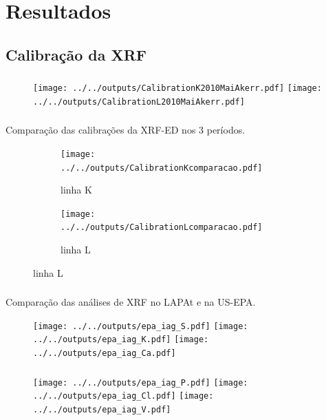 \section{Resultados}

\subsection{Calibração da XRF}

\begin{frame}
  \frametitle{}
  \begin{figure}
      \centering
      \texttt{[image: ../../outputs/CalibrationK2010MaiAkerr.pdf]}
      \texttt{[image: ../../outputs/CalibrationL2010MaiAkerr.pdf]}
  \end{figure}
\end{frame}

\begin{frame}
  \frametitle{}
  Comparação das calibrações da XRF-ED nos 3 períodos.
  \begin{figure}[H]
    \begin{subfigure}[b]{0.5\textwidth}
      \texttt{[image: ../../outputs/CalibrationKcomparacao.pdf]}
      \caption{linha K}
    \end{subfigure}%
    \begin{subfigure}[b]{0.5\textwidth}
      \texttt{[image: ../../outputs/CalibrationLcomparacao.pdf]}
      \caption{linha L}
    \end{subfigure}
  \end{figure}
\end{frame}


\begin{frame}
  \frametitle{}
  Comparação das análises de XRF no LAPAt e na US-EPA. 
  \begin{figure}[H]
    \centering
      \texttt{[image: ../../outputs/epa\_iag\_S.pdf]}
      \texttt{[image: ../../outputs/epa\_iag\_K.pdf]}
      \texttt{[image: ../../outputs/epa\_iag\_Ca.pdf]}
  \end{figure}
\end{frame}


\begin{frame}
  \frametitle{}
  \begin{figure}[H]
    \centering
      \texttt{[image: ../../outputs/epa\_iag\_P.pdf]}
      \texttt{[image: ../../outputs/epa\_iag\_Cl.pdf]}
      \texttt{[image: ../../outputs/epa\_iag\_V.pdf]}
  \end{figure}
\end{frame}

